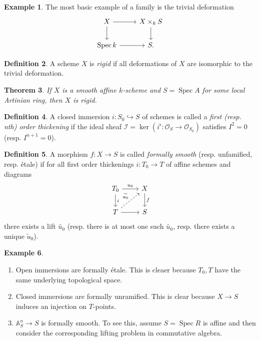 \documentclass[leqno, openany]{memoir}
\newtheorem{thm}{Theorem}[section]
\theoremstyle{definition}
\newtheorem{defn}[thm]{Definition}
\newtheorem{exm}[thm]{Example}
\theoremstyle{remark}
\theoremstyle{plain}
\theoremstyle{definition}
\theoremstyle{remark}
\newcommand{\A}{\mathbb{A}}
\newcommand{\mc}[1]{\mathcal{#1}}
\newcommand{\wt}[1]{\widetilde{#1}}
\DeclareMathOperator{\Spec}{Spec}
\begin{document}
\begin{exm}
    The most basic example of a family is the trivial deformation
    \begin{equation*}
    \begin{tikzcd}
        X \ar{r} \ar{d} & X \times_k S \ar{d} \\
        \Spec k \ar{r} & S.
    \end{tikzcd}
    \end{equation*}
\end{exm}

\begin{defn}
    A scheme $X$ is \textit{rigid} if all deformations of $X$ are isomorphic to the trivial deformation.
\end{defn}

\begin{thm}
    If $X$ is a smooth affine $k$-scheme and $S = \Spec A$ for some local Artinian ring, then $X$ is rigid.
\end{thm}

\begin{defn}
    A closed immersion $i \colon S_0 \hookrightarrow S$ of schemes is called a \textit{first (resp. nth) order thickening} if the ideal sheaf $\mc{I} = \ker(i^{\flat} \colon \mc{O}_S \to \mc{O}_{S_0})$ satisfies $I^2 = 0$ (resp. $I^{n+1} = 0$).
\end{defn}

\begin{defn}
    A morphism $f \colon X \to S$ is called \textit{formally smooth} (resp. unfamified, resp. \'etale) if for all first order thickenings $i \colon T_0 \to T$ of affine schemes and diagrams
    \begin{equation*}
    \begin{tikzcd}
        T_0 \ar{r}{u_0} \ar{d}{i} & X \ar{d}{f} \\
        T \ar{r} \ar[dashrightarrow]{ur}{\wt{u_0}} & S
    \end{tikzcd}
    \end{equation*}
    there exists a lift $\wt{u_0}$ (resp. there is at most one such $\wt{u_0}$, resp. there exists a unique $\wt{u}_0$).
\end{defn}

\begin{exm}\leavevmode
    \begin{enumerate}
        \item Open immersions are formally \'etale. This is cleaer because $T_0, T$ have the same underlying topological space.
        \item Closed immersions are formally unramified. This is clear because $X \to S$ induces an injection on $T$-points.
        \item $\A^n_S \to S$ is formally smooth. To see this, assume $S = \Spec R$ is affine and then consider the corresponding lifting problem in commutative algebra.
    \end{enumerate}
\end{exm}
\end{document}
